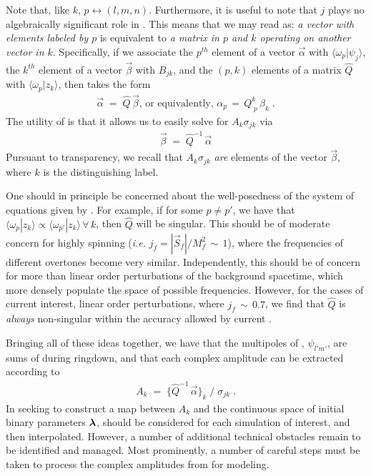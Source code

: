 \documentclass[twocolumn,prd,floatfix,preprintnumbers,a4paper,nofootinbib,superscriptaddress]{revtex4-1}
\def\j{j_f}
\begin{document}
Note that, like $k$, $p \leftrightarrow (l,m,n)$.
%
Furthermore, it is useful to note that $j$ plays no algebraically significant role in .
%
This means that we may read  as: \textit{a vector with elements labeled by $p$} is equivalent to \textit{a matrix in $p$ and $k$ operating on another vector in $k$}.
%
Specifically, if we associate the $p^{th}$ element of a vector $\vec{\alpha}$ with $\langle \omega_p | \psi_j \rangle$, the $k^{th}$ element of a vector $\vec{\beta}$ with $B_{jk}$, and the $(p,k)$ elements of a matrix $\hat{Q}$ with $\langle \omega_p | z_k \rangle$, then  takes the form
%
\begin{align}
	\label{eq:normal_form}
	\vec{\alpha} \; = \; \hat{Q} \, \vec{\beta} \text{, or equivalently, } \alpha_p \, = \, Q^k_{\;p} \, \beta_k \;.
\end{align}
%
The utility of  is that it allows us to easily solve for $A_k\sigma_{jk}$ via
%
\begin{align}
	\vec{\beta} \; = \; \hat{Q}^{-1} \, \vec{\alpha}
\end{align}
 Pursuant to transparency, we recall that $A_k\sigma_{jk}$ \textit{are} elements of the vector $\vec{\beta}$, where $k$ is the distinguishing label.
%
\par One should in principle be concerned about the well-posedness of the system of equations given by .
%
For example, if for some $p \neq p'$, we have that $\langle \omega_p | z_k \rangle  \propto  \langle \omega_{p'} | z_k \rangle \, \forall \, k$, then $\hat{Q}$ will be singular.
%
This should be of moderate concern for highly spinning  (\textit{i.e.} $\j{} = |\vec{S}_f|/M_f^2 \, \sim \, 1$), where the frequencies of different overtones become very similar.
%
Independently, this should be of concern for more than linear order perturbations of the background spacetime, which more densely populate the space of possible \qnm{} frequencies.
%
However, for the cases of current interest, linear order perturbations, where $\j{} \, \sim \, 0.7$, we find that $\hat{Q}$ is \textit{always} non-singular within the accuracy allowed by current \nr{}.
%
\par Bringing all of these ideas together, we have that the multipoles of \nr{}, $\psi_{l'm'}$, are sums of  during ringdown, and that each  complex amplitude can be extracted according to
%
\begin{align}
	\label{eq:qnm_amp_sol}
	A_k \; = \; \{ \hat{Q}^{-1} \, \vec{\alpha} \}_k \; / \;  \sigma_{jk} \; .
\end{align}
%
In seeking to construct a map between $A_k$ and the continuous space of initial binary parameters ${\bm{\lambda}}$,  should be considered for each simulation of interest, and then interpolated.
%
However, a number of additional technical obstacles remain to be identified and managed.
%
Most prominently, a number of careful steps must be taken to process the complex \qnm{} amplitudes from  for modeling.
%
\end{document}
